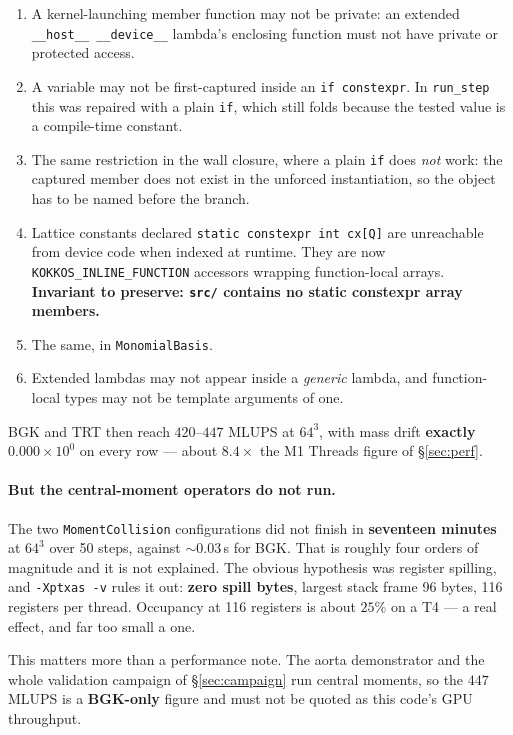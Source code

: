 \documentclass[11pt,a4paper]{article}
\newcommand{\code}[1]{\texttt{\small #1}}
\newcommand{\e}[1]{\times 10^{#1}}
\begin{document}
\begin{enumerate}[leftmargin=1.4em,itemsep=2pt]
\item A kernel-launching member function may not be private: an extended
  \code{\_\_host\_\_ \_\_device\_\_} lambda's enclosing function must not have
  private or protected access.
\item A variable may not be first-captured inside an \code{if constexpr}. In
  \code{run\_step} this was repaired with a plain \code{if}, which still folds
  because the tested value is a compile-time constant.
\item The same restriction in the wall closure, where a plain \code{if} does
  \emph{not} work: the captured member does not exist in the unforced
  instantiation, so the object has to be named before the branch.
\item Lattice constants declared \code{static constexpr int cx[Q]} are
  unreachable from device code when indexed at runtime. They are now
  \code{KOKKOS\_INLINE\_FUNCTION} accessors wrapping function-local arrays.
  \textbf{Invariant to preserve: \code{src/} contains no static constexpr array
  members.}
\item The same, in \code{MonomialBasis}.
\item Extended lambdas may not appear inside a \emph{generic} lambda, and
  function-local types may not be template arguments of one.
\end{enumerate}

\noindent BGK and TRT then reach $420$--$447$ MLUPS at $64^3$, with mass drift
\textbf{exactly $0.000\e{0}$} on every row --- about $8.4\times$ the M1 Threads
figure of \S\ref{sec:perf}.

\paragraph{But the central-moment operators do not run.} The two
\code{MomentCollision} configurations did not finish in \textbf{seventeen
minutes} at $64^3$ over 50 steps, against $\sim0.03$\,s for BGK. That is roughly
four orders of magnitude and it is not explained. The obvious hypothesis was
register spilling, and \code{-Xptxas -v} rules it out: \textbf{zero spill bytes},
largest stack frame 96 bytes, 116 registers per thread. Occupancy at 116
registers is about $25\%$ on a T4 --- a real effect, and far too small a one.

This matters more than a performance note. The aorta demonstrator and the whole
validation campaign of \S\ref{sec:campaign} run central moments, so the $447$
MLUPS is a \textbf{BGK-only} figure and must not be quoted as this code's GPU
throughput.
\end{document}
